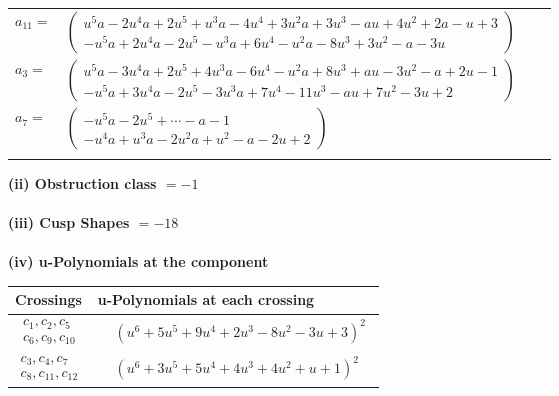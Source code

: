\documentclass[1p]{elsarticle_modified}
\theoremstyle{definition}
\begin{document}
\begin{tabular}{m{7pt} m{180pt} m{7pt} m{180pt} }
\flushright $a_{11}=$&$\begin{pmatrix}u^5 a-2 u^4 a+2 u^5+u^3 a-4 u^4+3 u^2 a+3 u^3- a u+4 u^2+2 a- u+3\\- u^5 a+2 u^4 a-2 u^5- u^3 a+6 u^4- u^2 a-8 u^3+3 u^2- a-3 u\end{pmatrix}$ \\
\flushright $a_{3}=$&$\begin{pmatrix}u^5 a-3 u^4 a+2 u^5+4 u^3 a-6 u^4- u^2 a+8 u^3+a u-3 u^2- a+2 u-1\\- u^5 a+3 u^4 a-2 u^5-3 u^3 a+7 u^4-11 u^3- a u+7 u^2-3 u+2\end{pmatrix}$ \\
\flushright $a_{7}=$&$\begin{pmatrix}- u^5 a-2 u^5+\cdots- a-1\\- u^4 a+u^3 a-2 u^2 a+u^2- a-2 u+2\end{pmatrix}$\\&\end{tabular}
\flushleft \textbf{(ii) Obstruction class $= -1$}\\~\\
\flushleft \textbf{(iii) Cusp Shapes $= -18$}\\~\\
\newpage\renewcommand{\arraystretch}{1}
\flushleft \textbf{(iv) u-Polynomials at the component}\newline \\
\begin{tabular}{m{50pt}|m{274pt}}
Crossings & \hspace{64pt}u-Polynomials at each crossing \\
\hline $$\begin{aligned}c_{1},c_{2},c_{5}\\c_{6},c_{9},c_{10}\end{aligned}$$&$\begin{aligned}
&(u^6+5 u^5+9 u^4+2 u^3-8 u^2-3 u+3)^2
\end{aligned}$\\
\hline $$\begin{aligned}c_{3},c_{4},c_{7}\\c_{8},c_{11},c_{12}\end{aligned}$$&$\begin{aligned}
&(u^6+3 u^5+5 u^4+4 u^3+4 u^2+u+1)^2
\end{aligned}$\\
\hline
\end{tabular}\\~\\
\end{document}
